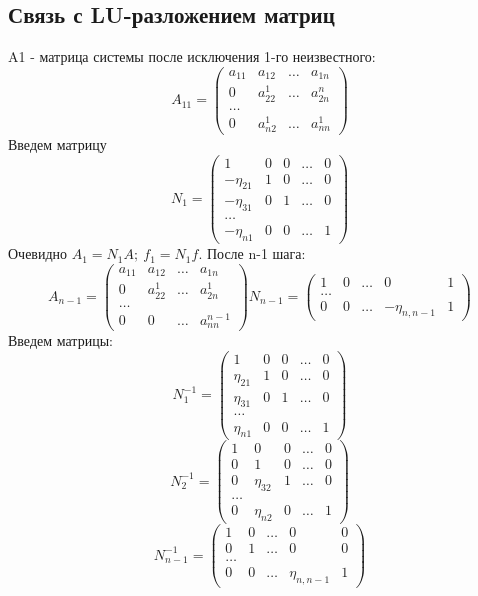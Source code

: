 \documentclass[a4paper]{article}
\begin{document}
\subsection{Связь с LU-разложением матриц}
A1 - матрица системы после исключения 1-го неизвестного:
$$ A_{11} = \begin{pmatrix}
a_{11} & a_{12} & \ldots & a_{1n} \\
0 & a_{22}^1 & \ldots & a_{2n}^n \\
\ldots \\
0 & a_{n2}^1 & \ldots & a_{nn}^1
\end{pmatrix}$$
Введем матрицу 
$$ N_1 = \begin{pmatrix}
1 & 0 & 0 & \ldots & 0 \\
-\eta_{21} & 1 & 0 & \ldots & 0 \\
-\eta_{31} & 0 & 1 & \ldots & 0 \\
\ldots \\
-\eta_{n1} & 0 & 0 & \ldots & 1
 \end{pmatrix} $$
Очевидно $A_1=N_1A; \ f_1=N_1f$. После n-1 шага:
$$
A_{n-1} = \begin{pmatrix}
a_{11} & a_{12} & \ldots & a_{1n} \\
0 & a_{22}^1 & \ldots & a_{2n}^1 \\
\ldots \\
0 & 0 & \ldots & a_{nn}^{n-1}
\end{pmatrix}
N_{n-1} = \begin{pmatrix}
1 & 0 & \ldots & 0 & 1 \\
\ldots \\
0 & 0 & \ldots & -\eta_{n,n-1} & 1
\end{pmatrix}
$$ 
Введем матрицы:
$$ N_1^{-1} = \begin{pmatrix}
1 & 0 & 0 & \ldots & 0 \\
\eta_{21} & 1 & 0 & \ldots & 0 \\
\eta_{31} & 0 & 1 & \ldots & 0 \\
\ldots \\
\eta_{n1} & 0 & 0 & \ldots & 1
\end{pmatrix} $$
$$
N_2^{-1} = \begin{pmatrix}
1 & 0 & 0 & \ldots & 0 \\
0 & 1 & 0 & \ldots & 0 \\
0 & \eta_{32} & 1 & \ldots & 0 \\
\ldots \\
0 & \eta_{n2} & 0 & \ldots & 1
\end{pmatrix}$$
$$
N_{n-1}^{-1} = \begin{pmatrix}
1 & 0 & \ldots & 0 & 0 \\
0 & 1 & \ldots & 0 & 0 \\
\ldots \\
0 & 0 & \ldots & \eta_{n,n-1} & 1
\end{pmatrix}$$
\end{document}
